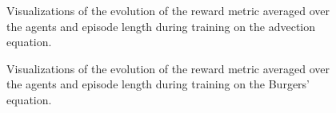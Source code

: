 \begin{figure}[h]
    \centering
    \hfill
    \hfill
    \hfill
    \caption{Visualizations of the evolution of the reward metric averaged over the agents and episode length during training on the advection equation.}
    \label{fig:advection_training_graphs}
\end{figure}

\begin{figure}[h]
    \centering
    \centering
    \hfill
    \hfill
    \hfill
    \caption{Visualizations of the evolution of the reward metric averaged over the agents and episode length during training on the Burgers' equation.}
    \label{fig:burgers_training_graphs}
\end{figure}

